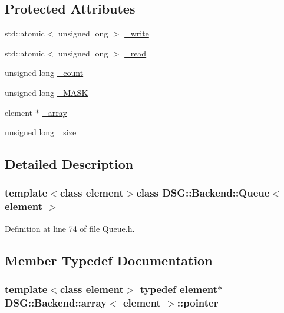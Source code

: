 \subsection*{Protected Attributes}
\begin{DoxyCompactItemize}
\item 
std\+::atomic$<$ unsigned long $>$ \hyperlink{classDSG_1_1Backend_1_1Queue_adbbe7e332752d500e7b9fadeb08cac54}{\+\_\+write}
\item 
std\+::atomic$<$ unsigned long $>$ \hyperlink{classDSG_1_1Backend_1_1Queue_a10510513da0290a435fe47079287cf29}{\+\_\+read}
\item 
unsigned long \hyperlink{classDSG_1_1Backend_1_1Queue_ae2ec3926f9e8cbabd17dadb309bcc26f}{\+\_\+count}
\item 
unsigned long \hyperlink{classDSG_1_1Backend_1_1Queue_ad82aa028cc33db5cc22a4c478dabe399}{\+\_\+\+M\+A\+S\+K}
\item 
element $\ast$ \hyperlink{classDSG_1_1Backend_1_1array_a520f838f921d4f48852694e79da0564c}{\+\_\+array}
\item 
unsigned long \hyperlink{classDSG_1_1Backend_1_1array_a44349f32c09ebb31d5eadbe9a222cba2}{\+\_\+size}
\end{DoxyCompactItemize}


\subsection{Detailed Description}
\subsubsection*{template$<$class element$>$class D\+S\+G\+::\+Backend\+::\+Queue$<$ element $>$}



Definition at line 74 of file Queue.\+h.



\subsection{Member Typedef Documentation}
\hypertarget{classDSG_1_1Backend_1_1array_abfd0db2267892f4d2f397638faf85ca3}{
\subsubsection[{pointer}]{\setlength{\rightskip}{0pt plus 5cm}template$<$class element$>$ typedef element$\ast$ {\bf D\+S\+G\+::\+Backend\+::array}$<$ element $>$\+::{\bf pointer}\hspace{0.3cm}{\ttfamily [inherited]}}}\label{classDSG_1_1Backend_1_1array_abfd0db2267892f4d2f397638faf85ca3}


